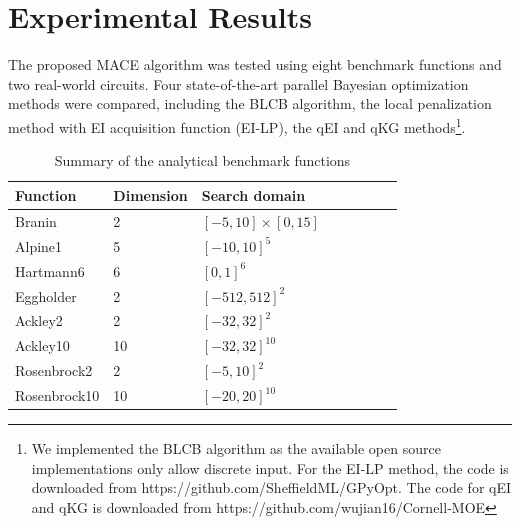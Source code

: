 \section{Experimental Results}



The proposed MACE algorithm was tested using eight benchmark functions and two
real-world circuits. Four state-of-the-art parallel Bayesian optimization
methods were compared, including the BLCB algorithm, the local penalization
method with EI acquisition function (EI-LP), the qEI and qKG
methods\footnote{We implemented the BLCB algorithm as the available open source
implementations only allow discrete input. For the EI-LP method, the code is
downloaded from https://github.com/SheffieldML/GPyOpt. The code for qEI and qKG
is downloaded from https://github.com/wujian16/Cornell-MOE}. 

\begin{table}[!htb]
    \centering
    \caption{Summary of the analytical benchmark functions}
    \label{tab:summaryanalygical}
    \begin{tabular}{llllllll}
        \toprule
         Function           & Dimension        & Search domain             \\ \midrule
         Branin             & 2                & $[-5,  10]\times[0, 15]$  \\
         Alpine1            & 5                & $[-10, 10]^5$             \\
         Hartmann6          & 6                & $[0,   1]^6$              \\
         Eggholder          & 2                & $[-512, 512]^2$           \\
         Ackley2            & 2                & $[-32, 32]^2$             \\
         Ackley10           & 10               & $[-32, 32]^{10}$          \\
         Rosenbrock2        & 2                & $[-5,  10]^2$             \\
         Rosenbrock10       & 10               & $[-20, 20]^{10}$          \\
        \bottomrule
    \end{tabular}
\end{table}

